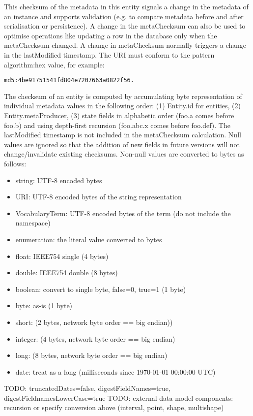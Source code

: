       This checksum of the metadata in this entity signals a change in the metadata of an instance and supports validation (e.g. to compare metadata before and after serialisation or persistence). A change in the metaChecksum can also be used to optimise operations like updating a row in the database only when the metaChecksum changed. A change in metaChecksum normally triggers a change in the lastModified timestamp. The URI must conform to the pattern {algorithm}:{hex value}, for example: \begin{verbatim}md5:4be91751541fd804e7207663a0822f56.\end{verbatim} The checksum of an entity is computed by accumulating byte representation of individual metadata values in the following order: (1) Entity.id for entities, (2) Entity.metaProducer, (3) state fields in alphabetic order (foo.a comes before foo.b) and using depth-first recursion (foo.abc.x comes before foo.def). The lastModified timestamp is not included in the metaChecksum calculation. Null values are ignored so that the addition of new fields in future versions will not change/invalidate existing checksums. Non-null values are converted to bytes as follows: \begin{itemize} \item string: UTF-8 encoded bytes \item URI: UTF-8 encoded bytes of the string representation \item VocabularyTerm: UTF-8 encoded bytes of the term (do not include the namespace) \item enumeration: the literal value converted to bytes \item float: IEEE754 single (4 bytes) \item double: IEEE754 double (8 bytes) \item boolean: convert to single byte, false=0, true=1 (1 byte) \item byte: as-is (1 byte) \item short: (2 bytes, network byte order == big endian)) \item integer: (4 bytes, network byte order == big endian) \item long: (8 bytes, network byte order == big endian) \item date: treat as a long (milliseconds since 1970-01-01 00:00:00 UTC) \end{itemize} TODO: truncatedDates=false, digestFieldNames=true, digestFieldnamesLowerCase=true TODO: external data model components: recursion or specify conversion above (interval, point, shape, multishape)

